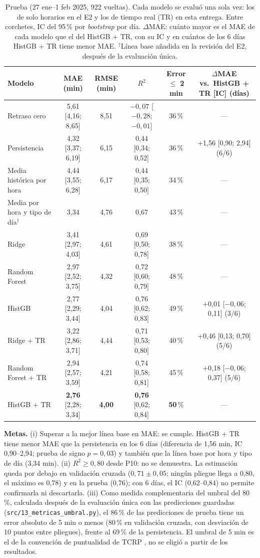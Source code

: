\documentclass[conference,spanish]{IEEEtran}
\begin{document}
\begin{table}[t]
\centering
\caption{Prueba (27 ene--1 feb 2025, 922 vueltas). Cada modelo se evaluó una sola vez: los de solo horarios en el E2 y los de tiempo real (TR) en esta entrega. Entre corchetes, IC del 95\,\% por \textit{bootstrap} por día. $\Delta$MAE: cuánto mayor es el MAE de cada modelo que el del HistGB + TR, con su IC y en cuántos de los 6 días HistGB + TR tiene menor MAE. $^\dagger$Línea base añadida en la revisión del E2, después de la evaluación única.}
\label{tab:test}
\footnotesize
\begin{tabular}{@{}lccccc@{}}
\toprule
\textbf{Modelo} & \textbf{MAE (min)} & \textbf{RMSE (min)} & \textbf{$R^2$} & \textbf{Error $\le$ 2 min} & \textbf{$\Delta$MAE vs.\ HistGB + TR [IC] (días)}\\
\midrule
Retraso cero & 5,61 [4,16; 8,65] & 8,51 & $-0{,}07$ [$-0{,}28$; $-0{,}01$] & 36\,\% & ---\\
Persistencia & 4,32 [3,37; 6,19] & 6,15 & 0,44 [0,34; 0,52] & 36\,\% & +1,56 [0,90; 2,94] (6/6)\\
Media histórica por hora & 4,44 [3,55; 6,28] & 6,17 & 0,44 [0,35; 0,50] & 34\,\% & ---\\
Media por hora y tipo de día$^\dagger$ & 3,34 & 4,76 & 0,67 & 43\,\% & ---\\
\midrule
Ridge & 3,41 [2,97; 4,03] & 4,61 & 0,69 [0,50; 0,78] & 38\,\% & ---\\
Random Forest & 2,97 [2,52; 3,75] & 4,32 & 0,72 [0,60; 0,79] & 48\,\% & ---\\
HistGB & 2,77 [2,29; 3,44] & 4,04 & 0,76 [0,62; 0,83] & 49\,\% & +0,01 [$-0{,}06$; 0,11] (3/6)\\
\midrule
Ridge + TR & 3,22 [2,86; 3,71] & 4,44 & 0,71 [0,53; 0,80] & 40\,\% & +0,46 [0,13; 0,70] (5/6)\\
Random Forest + TR & 2,94 [2,57; 3,59] & 4,21 & 0,74 [0,58; 0,81] & 45\,\% & +0,18 [$-0{,}06$; 0,37] (5/6)\\
HistGB + TR & \textbf{2,76} [2,28; 3,34] & \textbf{4,00} & \textbf{0,76} [0,62; 0,84] & \textbf{50}\,\% & ---\\
\bottomrule
\end{tabular}
\end{table}

\textbf{Metas.} (i) Superar a la mejor línea base en MAE: se cumple. HistGB + TR tiene menor MAE que la persistencia en los 6 días (diferencia de 1,56 min, IC 0,90--2,94; prueba de signo $p=0{,}03$) y también que la línea base por hora y tipo de día (3,34 min). (ii) $R^2\ge0{,}80$ desde P10: no se demuestra. La estimación queda por debajo en validación cruzada ($0{,}71\pm0{,}05$; ningún pliegue llega a 0,80, el máximo es 0,78) y en la prueba (0,76); con 6 días, el IC (0,62--0,84) no permite confirmarla ni descartarla. (iii) Como medida complementaria del umbral del 80\,\%, calculada después de la evaluación única con las predicciones guardadas (\texttt{src/13\_metricas\_umbral.py}), el 86\,\% de las predicciones de prueba tiene un error absoluto de 5 min o menos (80\,\% en validación cruzada, con desviación de 10 puntos entre pliegues), frente al 69\,\% de la persistencia. El umbral de 5 min es el de la convención de puntualidad de TCRP \cite{tcrp2003}, no se eligió a partir de los resultados.
\end{document}
